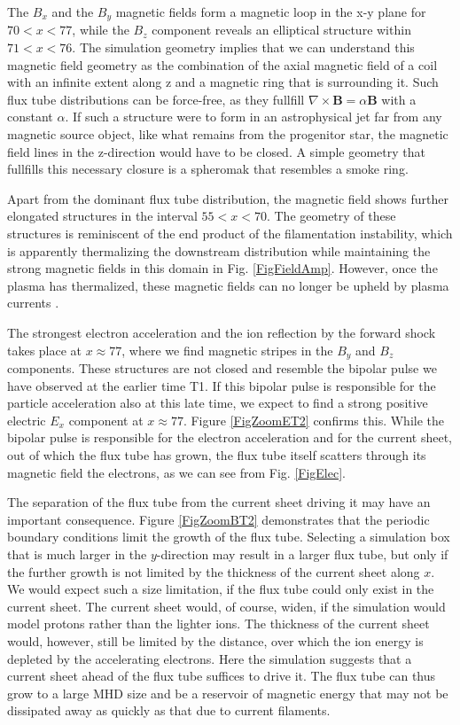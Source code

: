 \documentclass[structabstract]{aa}
\begin{document}
The $B_x$ and the $B_y$ magnetic fields form a magnetic loop in the x-y plane for $70 < x < 77$, while 
the $B_z$ component reveals an elliptical structure within $71<x<76$. The simulation geometry implies
that we can understand this magnetic field geometry as the combination of the axial magnetic field of
a coil with an infinite extent along z and a magnetic ring that is surrounding it. Such flux tube 
distributions can be force-free, as they fullfill $\nabla \times \mathbf{B} = \alpha \mathbf{B}$ with
a constant $\alpha$. If such a structure were to form in an astrophysical jet far from any magnetic
source object, like what remains from the progenitor star, the magnetic field lines in the z-direction 
would have to be closed. A simple geometry that fullfills this necessary closure is a spheromak that 
resembles a smoke ring. 

Apart from the dominant flux tube distribution, the magnetic field shows further elongated structures 
in the interval $55 < x < 70$. The geometry of these structures is reminiscent of the end product of 
the filamentation instability, which is apparently thermalizing the downstream distribution while 
maintaining the strong magnetic fields in this domain in Fig. \ref{FigFieldAmp}. However, once the 
plasma has thermalized, these magnetic fields can no longer be upheld by plasma currents \citep{Waxman:2006qy}.

The strongest electron acceleration and the ion reflection by the forward shock takes place at $x\approx 77$,
where we find magnetic stripes in the $B_y$ and $B_z$ components. These structures are not closed and 
resemble the bipolar pulse we have observed at the earlier time T1. If this bipolar pulse is responsible
for the particle acceleration also at this late time, we expect to find a strong positive electric $E_x$ 
component at $x\approx 77$. Figure \ref{FigZoomET2} confirms this. While the bipolar pulse is responsible
for the electron acceleration and for the current sheet, out of which the flux tube has grown, the flux 
tube itself scatters through its magnetic field the electrons, as we can see from Fig. \ref{FigElec}.

The separation of the flux tube from the current sheet driving it may have an important consequence.
Figure \ref{FigZoomBT2} demonstrates that the periodic boundary conditions limit the growth of the flux
tube. Selecting a simulation box that is much larger in the $y$-direction may result in a larger flux 
tube, but only if the further growth is not limited by the thickness of the current sheet along
$x$. We would expect such a size limitation, if the flux tube could only exist in the current sheet. 
The current sheet would, of course, widen, if the simulation would model protons rather than the lighter 
ions. The thickness of the current sheet would, however, still be limited by the distance, over which 
the ion energy is depleted by the accelerating electrons. Here the simulation suggests that a current 
sheet ahead of the flux tube suffices to drive it. The flux tube can thus grow to a large MHD size and 
be a reservoir of magnetic energy that may not be dissipated away as quickly as that due to current 
filaments.  
\end{document}
